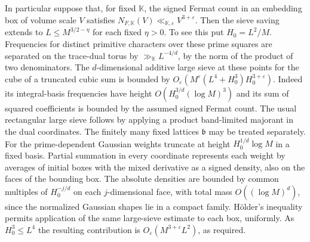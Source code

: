 \documentclass[11pt,letterpaper]{article}
\theoremstyle{definition}
\numberwithin{equation}{section}
\begin{document}
In particular suppose that, for fixed $\mathbb K$, the signed Fermat
count in an embedding box of volume scale $V$ satisfies
$N_{F,\mathbb K}(V)\ll_{\mathbb K,\varepsilon}V^{3+\varepsilon}$.
Then the sieve saving extends to $L\le M^{3/2-\eta}$ for each fixed
$\eta>0$. To see this put $H_0=L^2/M$. Frequencies for distinct
primitive characters over these prime squares are separated on the
trace-dual torus by $\gg_{\mathbb K}L^{-4/d}$, by the norm of the product
of two denominators. The $d$-dimensional additive large sieve at these
points for the cube of a truncated cubic sum is bounded by
$O_\varepsilon(M^\varepsilon(L^4+H_0^3)H_0^{3+\varepsilon})$.
Indeed its integral-basis frequencies have height
$O(H_0^{3/d}(\log M)^3)$ and its sum of squared coefficients is bounded
by the assumed signed Fermat count. The usual rectangular large sieve
follows by applying a product band-limited majorant in the dual
coordinates. The finitely many fixed lattices $\mathfrak b$ may be
treated separately. For the prime-dependent Gaussian weights truncate
at height $H_0^{1/d}\log M$ in a fixed basis. Partial summation in every
coordinate represents each weight by averages of initial boxes with
the mixed derivative as a signed density, also on the faces of the
bounding box. The absolute densities are bounded by common multiples
of $H_0^{-j/d}$ on each $j$-dimensional face, with total mass
$O((\log M)^d)$, since the normalized Gaussian shapes lie in a compact
family. H\"older's inequality permits application of the same large-sieve
estimate to each box, uniformly. As $H_0^3\le L^4$ the resulting
contribution is $O_\varepsilon(M^{3+\varepsilon}L^2)$, as required.
\end{document}
